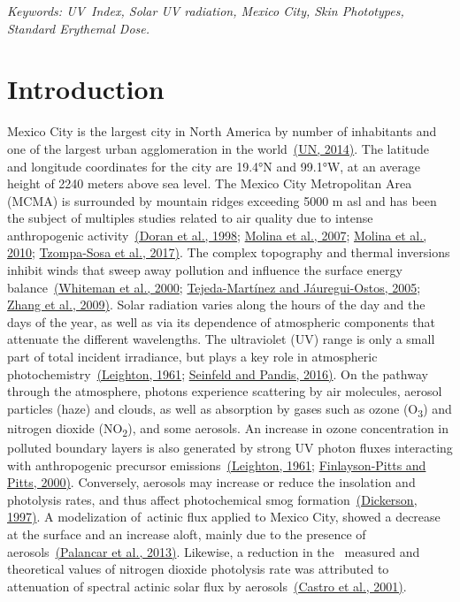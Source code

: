 \documentclass[10pt]{article}
\begin{document}
\sloppy


\emph{Keywords: UV~Index, Solar UV radiation, Mexico City, Skin
Phototypes, Standard Erythemal Dose.}

\section*{Introduction}

{\label{874460}}

Mexico City is the largest city in North America by number of
inhabitants and one of the largest urban agglomeration in the
world~\hyperref[csl:1]{(UN, 2014)}. The latitude and longitude coordinates for the
city are 19.4°N and 99.1°W, at an average height of 2240 meters above
sea level. The Mexico City Metropolitan Area (MCMA) is surrounded by
mountain ridges exceeding 5000 m asl and has been the subject of
multiples studies related to air quality due to intense anthropogenic
activity~\hyperref[csl:2]{(Doran et al., 1998}; \hyperref[csl:3]{Molina et al., 2007}; \hyperref[csl:4]{Molina et al., 2010}; \hyperref[csl:5]{Tzompa-Sosa et al., 2017)}. The complex topography and thermal
inversions inhibit winds that sweep away pollution and influence the
surface energy balance~\hyperref[csl:6]{(Whiteman et al., 2000}; \hyperref[csl:7]{Tejeda-Martínez and Jáuregui-Ostos, 2005}; \hyperref[csl:8]{Zhang et al., 2009)}. Solar radiation varies along
the hours of the day and the days of the year, as well as via its
dependence of atmospheric components that attenuate the different
wavelengths. The ultraviolet (UV) range is only a small part of total
incident irradiance, but plays a key role in atmospheric
photochemistry~\hyperref[csl:9]{(Leighton, 1961}; \hyperref[csl:10]{Seinfeld and Pandis, 2016)}. On the pathway through the
atmosphere, photons experience scattering by air molecules, aerosol
particles (haze) and clouds, as well as absorption by gases such as
ozone (O\textsubscript{3}) and nitrogen dioxide (NO\textsubscript{2}),
and some aerosols. An increase in ozone concentration in polluted
boundary layers is also generated by strong UV photon fluxes interacting
with anthropogenic precursor emissions~\hyperref[csl:9]{(Leighton, 1961}; \hyperref[csl:11]{Finlayson-Pitts and Pitts, 2000)}. Conversely,
aerosols may increase or reduce the insolation and photolysis rates, and
thus affect photochemical smog formation~\hyperref[csl:12]{(Dickerson, 1997)}. A
modelization of~actinic flux applied to Mexico City, showed a decrease
at the surface and an increase aloft, mainly due to the presence of
aerosols~\hyperref[csl:13]{(Palancar et al., 2013)}. Likewise, a reduction in the~ measured and
theoretical values of nitrogen dioxide photolysis rate was attributed to
attenuation of spectral actinic solar flux by
aerosols~\hyperref[csl:14]{(Castro et al., 2001)}.~
\end{document}
